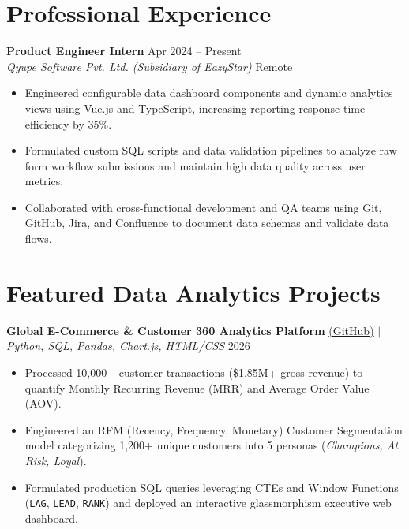 \documentclass[a4paper,10pt]{article}
\begin{document}
\section{Professional Experience}
\textbf{Product Engineer Intern} \hfill Apr 2024 -- Present \\
\textit{Qyupe Software Pvt. Ltd. (Subsidiary of EazyStar)} \hfill Remote
\begin{itemize}
    \item Engineered configurable data dashboard components and dynamic analytics views using Vue.js and TypeScript, increasing reporting response time efficiency by 35\%.
    \item Formulated custom SQL scripts and data validation pipelines to analyze raw form workflow submissions and maintain high data quality across user metrics.
    \item Collaborated with cross-functional development and QA teams using Git, GitHub, Jira, and Confluence to document data schemas and validate data flows.
\end{itemize}

\section{Featured Data Analytics Projects}
\textbf{Global E-Commerce \& Customer 360 Analytics Platform} \href{https://github.com/TusharJoshi7/Global-Ecommerce-Customer-360-Analytics}{\color{accent}(GitHub)} $|$ \textit{Python, SQL, Pandas, Chart.js, HTML/CSS} \hfill 2026
\begin{itemize}
    \item Processed 10,000+ customer transactions (\$1.85M+ gross revenue) to quantify Monthly Recurring Revenue (MRR) and Average Order Value (AOV).
    \item Engineered an RFM (Recency, Frequency, Monetary) Customer Segmentation model categorizing 1,200+ unique customers into 5 personas (\textit{Champions, At Risk, Loyal}).
    \item Formulated production SQL queries leveraging CTEs and Window Functions (\texttt{LAG}, \texttt{LEAD}, \texttt{RANK}) and deployed an interactive glassmorphism executive web dashboard.
\end{itemize}
\end{document}
